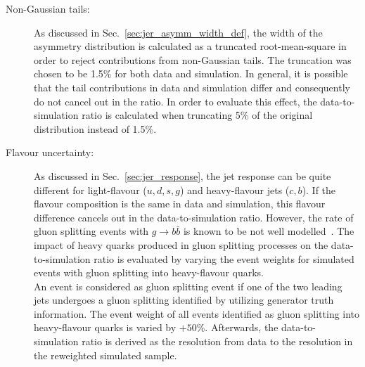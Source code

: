 \begin{description}
\item[Non-Gaussian tails:] As discussed in Sec.~\ref{sec:jer_asymm_width_def}, the width of the asymmetry distribution is calculated as a truncated root-mean-square in order to reject contributions from non-Gaussian tails. The truncation was chosen to be 1.5\% for both data and simulation. In general, it is possible that the tail contributions in data and simulation differ and consequently do not cancel out in the ratio. In order to evaluate this effect, the data-to-simulation ratio is calculated when truncating 5\% of the original distribution instead of 1.5\%.  

\item[Flavour uncertainty:] As discussed in Sec.~\ref{sec:jer_response}, the jet response can be quite different for light-flavour ($u,d,s,g$) and heavy-flavour jets ($c,b$). If the flavour composition is the same in data and simulation, this flavour difference cancels out in the data-to-simulation ratio. However, the rate of gluon splitting events with $g \rightarrow b\bar{b}$ is known to be not well modelled~\cite{Khachatryan:2011wq}. The impact of heavy quarks produced in gluon splitting processes on the data-to-simulation ratio is evaluated by varying the event weights for simulated events with gluon splitting into heavy-flavour quarks.\\
An event is considered as gluon splitting event if one of the two leading jets undergoes a gluon splitting identified by utilizing generator truth information. The event weight of all events identified as gluon splitting into heavy-flavour quarks is varied by $+ 50\%$. Afterwards, the data-to-simulation ratio is derived as the resolution from data to the resolution in the reweighted simulated sample. 


\end{description}

